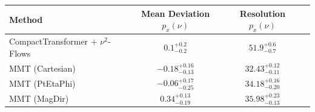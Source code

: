     \begin{tabular}{lccc}
        \toprule
        Method & Mean Deviation $p_{x}(\nu)$ & Resolution $p_{x}(\nu)$ \\
        \midrule
        CompactTransformer + $\nu^2$-Flows & $0.1^{+0.2}_{-0.2}$ & $51.9^{+0.6}_{-0.7}$ \\
        MMT (Cartesian) & $-0.18^{+0.16}_{-0.13}$ & $32.43^{+0.12}_{-0.11}$ \\
        MMT (PtEtaPhi) & $-0.06^{+0.17}_{-0.25}$ & $34.18^{+0.16}_{-0.20}$ \\
        MMT (MagDir) & $0.34^{+0.13}_{-0.19}$ & $35.98^{+0.23}_{-0.13}$ \\
        \bottomrule
    \end{tabular}